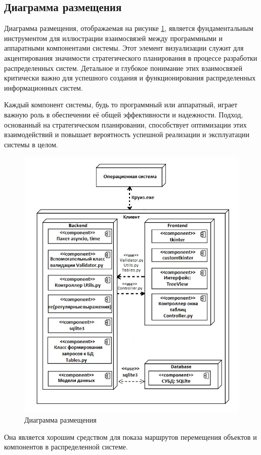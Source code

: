 \subsection{Диаграмма размещения}
Диаграмма размещения, отображаемая на рисунке \ref{fig:commonscheme4}, является фундаментальным инструментом для иллюстрации взаимосвязей между программными и аппаратными компонентами системы. Этот элемент визуализации служит для акцентирования значимости стратегического планирования
в процессе разработки распределенных систем. Детальное и глубокое понимание этих взаимосвязей критически важно для успешного создания и функционирования распределенных информационных систем.

Каждый компонент системы, будь то программный или аппаратный, играет важную роль в обеспечении её общей эффективности и надежности.
Подход, основанный на стратегическом планировании, способствует оптимизации этих взаимодействий и повышает вероятность успешной реализации и эксплуатации системы в целом.

\begin{figure} [ht]
	\centering
	\includegraphics[width=1\linewidth]{images/CommonScheme4}
	\caption{Диаграмма размещения}
	\label{fig:commonscheme4}
\end{figure}
Она является хорошим средством для показа маршрутов перемещения объектов и компонентов в распределенной системе.

